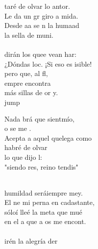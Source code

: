 \begin{cancion}%
	taré de olvar lo antor.\\
	Le da un gr giro a mida.\\
	Desde aa se n la humaad\\
	la sella de muni.\\
	\jump\\
	dirán los quee vean har:\\
	¿Dóndas loc. ¡Si eso es isible!\\
	pero  que, al fl, \\
	empre encontra \\
	más sillas de or y.\\jump\\
	\begin{chorus}%
	Nada brá que sientmío,\\
	o se me .\\
	Acepta a aquel quelega como  \\
	 habré de olvar  \\
	lo que dijo l:\\
	"siendo res,  reino tendis"\\
	\end{chorus}%
	\jump\\
	humildad seráiempre mey.\\
	El ne mi perna en cadastante,\\
	sóloí lleé la meta que mué \\
	en el a que a os me encont. \\
	\jump\\
	irén la alegría der  \\

\end{cancion}

